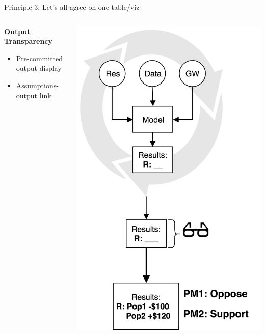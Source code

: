 \documentclass{beamer}
\begin{document}
\begin{frame}{Principle 3: Let's all agree on one table/viz}
\begin{columns}
\begin{column}{0.3\textwidth}
 \textbf{Output \\ Transparency}
   \begin{itemize}
   \item Pre-committed output display
   \item Assumptions- output link
   \end{itemize}
\end{column}
\begin{column}{0.7\textwidth}  %
    \begin{center}
    \vspace{-0.8em}
     \includegraphics[width=.6\textwidth]{../Images/o_transp.png}
     \end{center}
\end{column}
\end{columns}
\end{frame}
\end{document}
